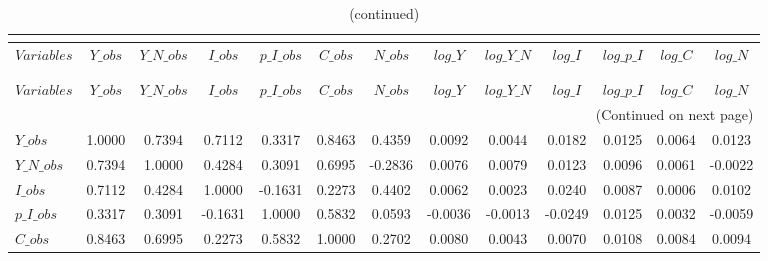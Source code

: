  
\begin{center}
\begin{longtable}{lcccccccccccc} 
\caption{MATRIX OF CORRELATIONS}\\
 \label{Table:th_corr_matrix}\\
\toprule 
$Variables  $	 & 	 $      Y\_obs$	 & 	 $  Y\_N\_obs$	 & 	 $      I\_obs$	 & 	 $  p\_I\_obs$	 & 	 $      C\_obs$	 & 	 $      N\_obs$	 & 	 $      log\_Y$	 & 	 $  log\_Y\_N$	 & 	 $      log\_I$	 & 	 $  log\_p\_I$	 & 	 $      log\_C$	 & 	 $      log\_N$\\
\midrule \endfirsthead 
\caption{(continued)}\\
 \toprule \\ 
$Variables  $	 & 	 $      Y\_obs$	 & 	 $  Y\_N\_obs$	 & 	 $      I\_obs$	 & 	 $  p\_I\_obs$	 & 	 $      C\_obs$	 & 	 $      N\_obs$	 & 	 $      log\_Y$	 & 	 $  log\_Y\_N$	 & 	 $      log\_I$	 & 	 $  log\_p\_I$	 & 	 $      log\_C$	 & 	 $      log\_N$\\
\midrule \endhead 
\midrule \multicolumn{13}{r}{(Continued on next page)} \\ \bottomrule \endfoot 
\bottomrule \endlastfoot 
$Y\_obs     $	 & 	       1.0000	 & 	       0.7394	 & 	       0.7112	 & 	       0.3317	 & 	       0.8463	 & 	       0.4359	 & 	       0.0092	 & 	       0.0044	 & 	       0.0182	 & 	       0.0125	 & 	       0.0064	 & 	       0.0123 \\ 
$Y\_N\_obs  $	 & 	       0.7394	 & 	       1.0000	 & 	       0.4284	 & 	       0.3091	 & 	       0.6995	 & 	      -0.2836	 & 	       0.0076	 & 	       0.0079	 & 	       0.0123	 & 	       0.0096	 & 	       0.0061	 & 	      -0.0022 \\ 
$I\_obs     $	 & 	       0.7112	 & 	       0.4284	 & 	       1.0000	 & 	      -0.1631	 & 	       0.2273	 & 	       0.4402	 & 	       0.0062	 & 	       0.0023	 & 	       0.0240	 & 	       0.0087	 & 	       0.0006	 & 	       0.0102 \\ 
$p\_I\_obs  $	 & 	       0.3317	 & 	       0.3091	 & 	      -0.1631	 & 	       1.0000	 & 	       0.5832	 & 	       0.0593	 & 	      -0.0036	 & 	      -0.0013	 & 	      -0.0249	 & 	       0.0125	 & 	       0.0032	 & 	      -0.0059 \\ 
$C\_obs     $	 & 	       0.8463	 & 	       0.6995	 & 	       0.2273	 & 	       0.5832	 & 	       1.0000	 & 	       0.2702	 & 	       0.0080	 & 	       0.0043	 & 	       0.0070	 & 	       0.0108	 & 	       0.0084	 & 	       0.0094 \\ 

\end{longtable}
\end{center}
